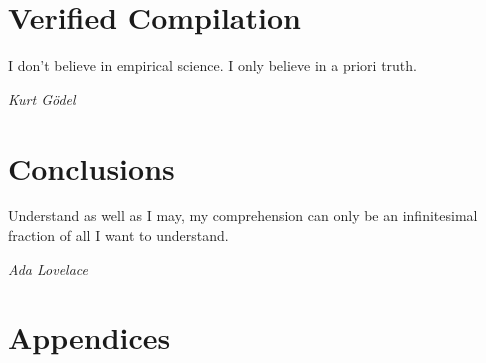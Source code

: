 \documentclass[botnum]{unmeethesis}
\begin{document}
\chapter{Verified Compilation}\label{chap:verified}
\epigraph{I don't believe in empirical science. I only believe in a priori
truth.}{\textit{Kurt Gödel}}









\chapter{Conclusions}\label{chap:conclusion}
\epigraph{Understand as well as I may, my comprehension can only be an
infinitesimal fraction of all I want to understand.}{\textit{Ada Lovelace}}


\chapter*{Appendices}

\appendix
 \label{chap:cem_appendix}
 \label{chap:coq_appendix}



\end{document}
